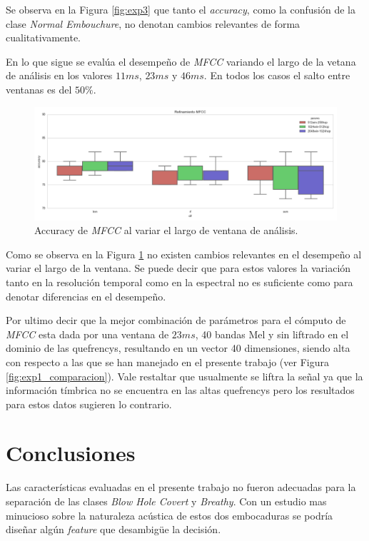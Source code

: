 \documentclass{article}
\begin{document}
Se observa en la Figura \ref{fig:exp3} que tanto el \textit{accuracy}, como la confusión de la clase \textit{Normal Embouchure}, no denotan cambios relevantes de forma cualitativamente.

En lo que sigue se evalúa el desempeño de \textit{MFCC} variando el largo de la vetana de análisis en los valores $11ms$, $23ms$ y $46ms$. En todos los casos el salto entre ventanas es del $50\%$.

\begin{figure}[H]
\begin{center}
\includegraphics[width=1\textwidth]{exp3_refinamiento} 
\caption{Accuracy de \textit{MFCC} al variar el largo de ventana de análisis.}
\label{fig:exp3_refinmamiento}
\end{center}
\end{figure}

Como se observa en la Figura \ref{fig:exp3_refinmamiento} no existen cambios relevantes en el desempeño al variar el largo de la ventana. Se puede decir que para estos valores la variación tanto en la resolución temporal como en la espectral no es suficiente como para denotar diferencias en el desempeño.  
\medskip

Por ultimo decir que la mejor combinación de parámetros para el cómputo de \textit{MFCC} esta dada por una ventana de $23ms$, 40 bandas Mel y sin liftrado en el dominio de las quefrencys, resultando en un vector 40 dimensiones, siendo alta con respecto a las que se han manejado en el presente trabajo (ver Figura \ref{fig:exp1_comparacion}). Vale restaltar que usualmente se liftra la señal ya que la información tímbrica no se encuentra en las altas quefrencys pero los resultados para estos datos sugieren lo contrario.
\medskip

\newpage

\section{Conclusiones}
\label{conclusiones}
Las características evaluadas en el presente trabajo no fueron adecuadas para la separación de las clases \textit{Blow Hole Covert} y \textit{Breathy}. Con un estudio mas minucioso sobre la naturaleza acústica de estos dos embocaduras se podría diseñar algún \textit{feature} que desambigüe la decisión. 
\medskip
\end{document}
